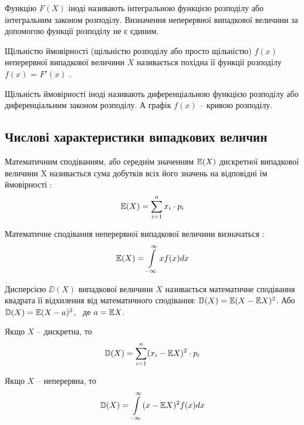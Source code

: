 Функцію $F(X)$ іноді називають інтегральною функцією розподілу або інтегральним законом розподілу. Визначення неперервної випадкової величини за допомогою функції розподілу не є єдиним.

\begin{defin}
Щільністю ймовірності (щільністю розподілу або просто щільністю) $f(x)$ неперервної випадкової величини $X$ називається похідна її функції розподілу $f(x)$ = $F'(x)$ \cite{kremer2004}.
\end{defin}

Щільність ймовірності іноді називають диференціальною функцією розподілу або диференціальним законом розподілу. А графік $f(x)$ – кривою розподілу.

\subsection{Числові характеристики випадкових величин}
\begin{defin}
	Математичним сподіванням, або середнім значенням $\mathbb{E}(X)$ дискретної випадкової величини X називається сума добутків всіх його значень на відповідні їм ймовірності \cite{kremer2004}:
	\begin{equation}
		\mathbb{E}(X)= \sum\limits_{i=1}^n x_i \cdot p_i
	\end{equation}
\end{defin}

\begin{defin}
	Математичне сподівання неперервної випадкової величини визначаться \cite{kremer2004}:
	\begin{equation}
		\mathbb{E}(X)= \int\limits_{-\infty}^\infty x f(x) dx
	\end{equation}
\end{defin}

\begin{defin}
	Дисперсією $\DD(X)$ випадкової величини $X$ називається математичне сподівання квадрата її відхилення від математичного сподівання: $\mathbb{D}(X)=\mathbb{E}(X-\mathbb{E} X)^2$. Або $\mathbb{D}(X)=\mathbb{E}(X - a)^2$, ~де $a=\mathbb{E} X$.
	
	Якщо $X$ – дискретна, то
	\begin{equation}
		\mathbb{D}(X)=\sum\limits_{i=1}^n (x_i - \mathbb{E} X)^2 \cdot p_i
	\end{equation}
	
	Якщо $X$ – неперервна, то
	\begin{equation}
		\mathbb{D}(X)=\int\limits_{-\infty}^\infty (x - \mathbb{E} X)^2 f(x) dx
	\end{equation}
\end{defin}

